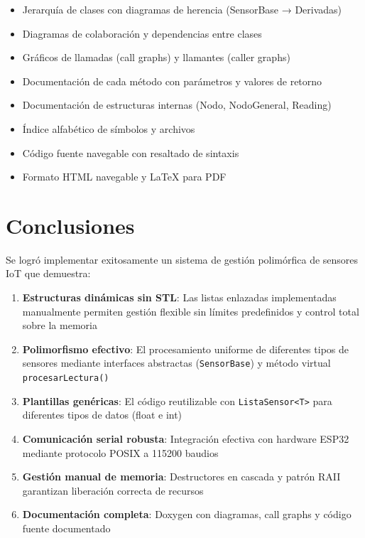 \documentclass[conference]{IEEEtran}
\begin{document}
\begin{itemize}
    \item Jerarquía de clases con diagramas de herencia (SensorBase → Derivadas)
    \item Diagramas de colaboración y dependencias entre clases
    \item Gráficos de llamadas (call graphs) y llamantes (caller graphs)
    \item Documentación de cada método con parámetros y valores de retorno
    \item Documentación de estructuras internas (Nodo, NodoGeneral, Reading)
    \item Índice alfabético de símbolos y archivos
    \item Código fuente navegable con resaltado de sintaxis
    \item Formato HTML navegable y LaTeX para PDF
\end{itemize}

\section{Conclusiones}

Se logró implementar exitosamente un sistema de gestión polimórfica de sensores IoT que demuestra:

\begin{enumerate}
    \item \textbf{Estructuras dinámicas sin STL}: Las listas enlazadas implementadas manualmente permiten gestión flexible sin límites predefinidos y control total sobre la memoria
    \item \textbf{Polimorfismo efectivo}: El procesamiento uniforme de diferentes tipos de sensores mediante interfaces abstractas (\texttt{SensorBase}) y método virtual \texttt{procesarLectura()}
    \item \textbf{Plantillas genéricas}: El código reutilizable con \texttt{ListaSensor<T>} para diferentes tipos de datos (float e int)
    \item \textbf{Comunicación serial robusta}: Integración efectiva con hardware ESP32 mediante protocolo POSIX a 115200 baudios
    \item \textbf{Gestión manual de memoria}: Destructores en cascada y patrón RAII garantizan liberación correcta de recursos
    \item \textbf{Documentación completa}: Doxygen con diagramas, call graphs y código fuente documentado
\end{enumerate}
\end{document}
